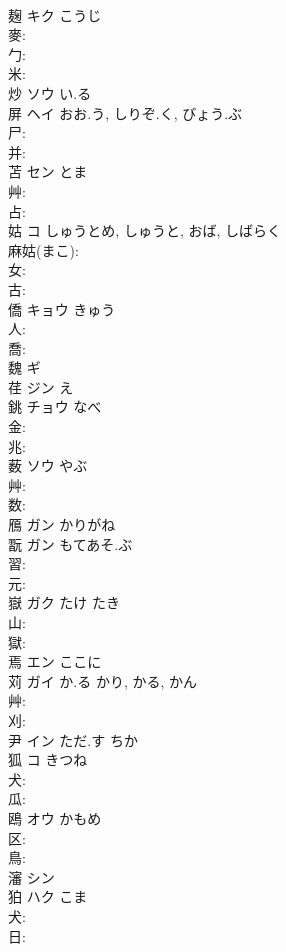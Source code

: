\documentclass[8pt]{extreport}
\begin{document}
\begin{CJK}{UTF8}{min}
\\	麹	キク	こうじ		
\\	麥: 
\\	勹: 
\\	米: 
\\	炒	ソウ い.る			
\\	屏	ヘイ	おお.う, しりぞ.く, びょう.ぶ		
\\	尸: 
\\	并: 
\\	苫	セン	とま		
\\	艸: 
\\	占: 
\\	姑	コ	しゅうとめ, しゅうと, おば, しばらく		
\\	麻姑(まこ): 
\\	女: 
\\	古: 
\\	僑	キョウ		きゅう	
\\	人: 
\\	喬: 
\\	魏	ギ			
\\	荏	ジン え			
\\	銚	チョウ	なべ		
\\	金: 
\\	兆: 
\\	薮	ソウ	やぶ		
\\	艸: 
\\	数: 
\\	鴈	ガン かりがね			
\\	翫	ガン	もてあそ.ぶ			
\\	習: 
\\	元: 
\\	嶽	ガク	たけ	たき	
\\	山: 
\\	獄: 
\\	焉	エン ここに			
\\	苅	ガイ	か.る	かり, かる, かん	
\\	艸: 
\\	刈: 
\\	尹	イン ただ.す ちか			
\\	狐	コ	きつね		
\\	犬: 
\\	瓜: 
\\	鴎	オウ	かもめ		
\\	区: 
\\	鳥: 
\\	瀋	シン			
\\	狛	ハク	こま		
\\	犬: 
\\	日: 

\end{CJK}
\end{document}
